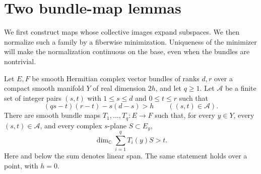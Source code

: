 \section{Two bundle-map lemmas}
\label{sec:bundle-map-lemmas}

We first construct maps whose collective images expand subspaces.  We
then normalize such a family by a fiberwise minimization.  Uniqueness of
the minimizer will make the normalization continuous on the base, even
when the bundles are nontrivial.

\begin{lemma}
\label{lem:incidence}
Let $E,F$ be smooth Hermitian complex vector bundles of ranks $d,r$ over
a compact smooth manifold $Y$ of real dimension $2h$, and let $q\geq1$.
Let $\mathcal A$ be a finite set of integer pairs $(s,t)$ with
$1\leq s\leq d$ and $0\leq t\leq r$ such that
\begin{equation}
  (qs-t)(r-t)-s(d-s)>h
  \qquad ((s,t)\in\mathcal A).
  \label{eq:incidence-dimension}
\end{equation}
There are smooth bundle maps $T_1,\ldots,T_q:E\to F$ such that, for every
$y\in Y$, every $(s,t)\in\mathcal A$, and every complex $s$-plane
$S\subset E_y$,
\[
  \dim_{\mathbb C}\sum_{i=1}^q T_i(y)S>t.
\]
Here and below the sum denotes linear span.  The same statement holds
over a point, with $h=0$.
\end{lemma}

